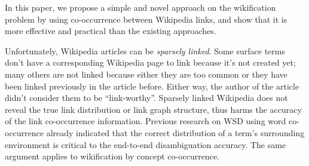 In this paper, 
we propose a simple and novel approach on the wikification problem
by using co-occurrence between Wikipedia links, and show that it is
more effective and practical than the existing approaches.


Unfortunately, Wikipedia articles can be {\em sparsely linked}.
Some surface terms don't have a corresponding Wikipedia page
to link because it's not created yet; many others are not linked because either
they are too common or they have been linked previously in the article before.
Either way, the author of the article didn't consider them to be
``link-worthy''. Sparsely linked Wikipedia does not reveal the true
link distribution or link graph structure, thus harms
the accuracy of the link co-occurrence information.
Previous research on WSD using word
co-occurrence \cite{Stokoe2003:WSD} already indicated that
the correct distribution of a term's surrounding environment is
critical to the end-to-end disambiguation accuracy.
The same argument applies to wikification by concept co-occurrence.

%

